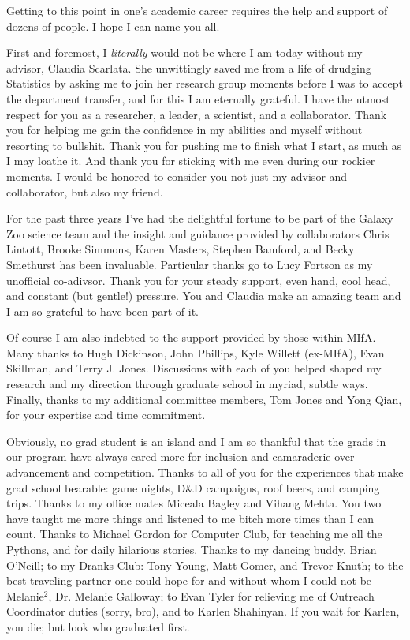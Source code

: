 

Getting to this point in one's academic career requires the help and support of dozens of people. I hope I can name you all. %

First and foremost, I \textit{literally} would not be where I am today without my advisor, Claudia Scarlata. She unwittingly saved me from a life of drudging Statistics by asking me to join her research group moments before I was to accept the department transfer, and for this I am eternally grateful. I have the utmost respect for you as a researcher, a leader, a scientist, and a collaborator. Thank you for helping me gain the confidence in my abilities and myself without resorting to bullshit. Thank you for pushing me to finish what I start, as much as I may loathe it. And thank you for sticking with me even during our rockier moments. I would be honored to consider you not just my advisor and collaborator, but also my friend. 


For the past three years I've had the delightful fortune to be part of the Galaxy Zoo science team and the insight and guidance provided by collaborators Chris Lintott, Brooke Simmons, Karen Masters, Stephen Bamford, and Becky Smethurst has been invaluable. Particular thanks go to Lucy Fortson as my unofficial co-adivsor. Thank you for your steady support, even hand, cool head, and constant (but gentle!) pressure.  You and Claudia make an amazing team and I am so grateful to have been part of it. 

Of course I am also indebted to the support provided by those within MIfA. Many thanks to Hugh Dickinson, John Phillips, Kyle Willett (ex-MIfA), Evan Skillman, and Terry J. Jones. Discussions with each of you helped shaped my research and my direction through graduate school in myriad, subtle ways. Finally, thanks to my additional committee members, Tom Jones and Yong Qian, for your expertise and time commitment. 


Obviously, no grad student is an island and I am so thankful that the grads in our program have always cared more for inclusion and camaraderie over advancement and competition. Thanks to all of you for the experiences that make grad school bearable: game nights, D\&D campaigns, roof beers, and camping trips. Thanks to my office mates Miceala Bagley and Vihang Mehta. You two have taught me more things and listened to me bitch more times than I can count. Thanks to Michael Gordon for Computer Club, for teaching me all the Pythons, and for daily hilarious stories. Thanks to my dancing buddy, Brian O'Neill; to my Dranks Club: Tony Young, Matt Gomer, and Trevor Knuth; to the best traveling partner one could hope for and without whom I could not be Melanie$^2$, Dr. Melanie Galloway; to Evan Tyler for relieving me of Outreach Coordinator duties (sorry, bro), and to Karlen Shahinyan. If you wait for Karlen, you die; but look who graduated first. 


